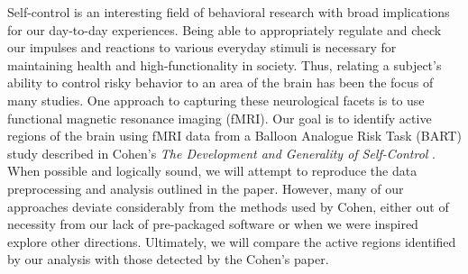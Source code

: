 \par Self-control is an interesting field of behavioral research with broad 
implications for our day-to-day experiences. Being able to appropriately 
regulate and check our impulses and reactions to various everyday stimuli 
is necessary for maintaining health and high-functionality in society. 
Thus, relating a subject’s ability to control risky behavior to an area 
of the brain has been the focus of many studies. One approach to 
capturing these neurological facets is to use functional magnetic resonance 
imaging (fMRI). Our goal is to identify active regions of the brain using 
fMRI data from a Balloon Analogue Risk Task (BART) study described in 
Cohen's \textit{The Development and Generality of Self-Control} 
\cite{CohenSelfControl}. When possible and logically sound, we will attempt 
to reproduce the data preprocessing and analysis outlined in the paper. 
However, many of our approaches deviate considerably from the methods 
used by Cohen, either out of necessity from our lack of pre-packaged 
software or when we were inspired explore other directions. Ultimately, we 
will compare the active regions identified by our analysis with those 
detected by the Cohen's paper. 
